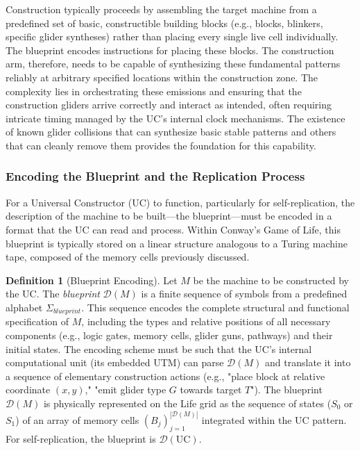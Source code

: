 \documentclass{article}
\theoremstyle{definition}
\newtheorem{definition}{Definition}[section]
\theoremstyle{plain}
\theoremstyle{plain}
\begin{document}
Construction typically proceeds by assembling the target machine from a predefined set of basic, constructible building blocks (e.g., blocks, blinkers, specific glider syntheses) rather than placing every single live cell individually. The blueprint encodes instructions for placing these blocks. The construction arm, therefore, needs to be capable of synthesizing these fundamental patterns reliably at arbitrary specified locations within the construction zone. The complexity lies in orchestrating these emissions and ensuring that the construction gliders arrive correctly and interact as intended, often requiring intricate timing managed by the UC's internal clock mechanisms. The existence of known glider collisions that can synthesize basic stable patterns and others that can cleanly remove them provides the foundation for this capability.

\subsubsection{Encoding the Blueprint and the Replication Process}
For a Universal Constructor (UC) to function, particularly for self-replication, the description of the machine to be built—the blueprint—must be encoded in a format that the UC can read and process. Within Conway's Game of Life, this blueprint is typically stored on a linear structure analogous to a Turing machine tape, composed of the memory cells previously discussed.

\begin{definition}[Blueprint Encoding]
Let $M$ be the machine to be constructed by the UC. The \textit{blueprint} $\mathcal{D}(M)$ is a finite sequence of symbols from a predefined alphabet $\Sigma_{blueprint}$. This sequence encodes the complete structural and functional specification of $M$, including the types and relative positions of all necessary components (e.g., logic gates, memory cells, glider guns, pathways) and their initial states. The encoding scheme must be such that the UC's internal computational unit (its embedded UTM) can parse $\mathcal{D}(M)$ and translate it into a sequence of elementary construction actions (e.g., "place block at relative coordinate $(x,y)$," "emit glider type $G$ towards target $T$"). The blueprint $\mathcal{D}(M)$ is physically represented on the Life grid as the sequence of states ($S_0$ or $S_1$) of an array of memory cells $(B_j)_{j=1}^{|\mathcal{D}(M)|}$ integrated within the UC pattern. For self-replication, the blueprint is $\mathcal{D}(\text{UC})$.
\end{definition}
\end{document}
